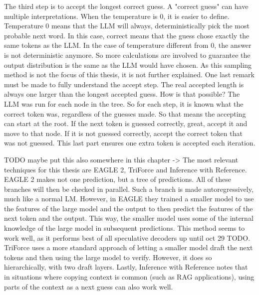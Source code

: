 The third step is to accept the longest correct guess. A "correct guess" can have multiple interpretations. When the temperature is 0, it is easier to define. Temperature 0 means that the LLM will always, deterministically pick the most probable next word. In this case, correct means that the guess chose exactly the same tokens as the LLM. In the case of temperature different from 0, the answer is not deterministic anymore. So more calculations are involved to guarantee the output distribution is the same as the LLM would have chosen. As this sampling method is not the focus of this thesis, it is not further explained. One last remark must be made to fully understand the accept step. The real accepted length is always one larger than the longest accepted guess. How is that possible? The LLM was run for each node in the tree. So for each step, it is known what the correct token was, regardless of the guesses made. So that means the accepting can start at the root. If the next token is guessed correctly, great, accept it and move to that node. If it is not guessed correctly, accept the correct token that was not guessed. This last part ensures one extra token is accepted each iteration.

TODO maybe put this also somewhere in this chapter ->
The most relevant techniques for this thesis are EAGLE 2, TriForce and Inference with Reference. EAGLE 2 makes not one prediction, but a tree of predictions. All of these branches will then be checked in parallel. Such a branch is made autoregressively, much like a normal LM. However, in EAGLE they trained a smaller model to use the features of the large model and the output to then predict the features of the next token and the output. This way, the smaller model uses some of the internal knowledge of the large model in subsequent predictions. This method seems to work well, as it performs best of all speculative decoders up until oct 29 TODO. TriForce uses a more standard approach of letting a smaller model draft the next tokens and then using the large model to verify. However, it does so hierarchically, with two draft layers. Lastly, Inference with Reference notes that in situations where copying context is common (such as RAG applications), using parts of the context as a next guess can also work well.